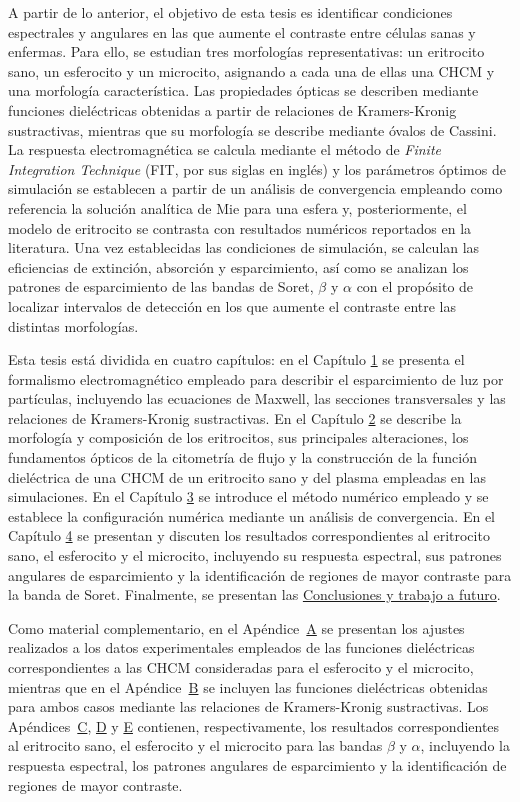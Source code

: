 A partir de lo anterior, el objetivo de esta tesis es identificar condiciones espectrales y angulares en las que aumente el contraste entre células sanas y enfermas. Para ello, se estudian tres morfologías representativas: un eritrocito sano, un esferocito y un microcito, asignando a cada una de ellas una CHCM y una morfología característica. Las propiedades ópticas se describen mediante funciones dieléctricas obtenidas a partir de relaciones de Kramers-Kronig sustractivas, mientras que su morfología se describe mediante óvalos de Cassini. La respuesta electromagnética se calcula mediante el método de \textit{Finite Integration Technique} (FIT, por sus siglas en inglés) y los parámetros óptimos de simulación se establecen a partir de un análisis de convergencia empleando como referencia la solución analítica de Mie para una esfera y, posteriormente, el modelo de eritrocito se contrasta con resultados numéricos reportados en la literatura. Una vez establecidas las condiciones de simulación, se calculan las eficiencias de extinción, absorción y esparcimiento, así como se analizan los patrones de esparcimiento de las bandas de Soret, $\beta$ y $\alpha$ con el propósito de localizar intervalos de detección en los que aumente el contraste entre las distintas morfologías.


Esta tesis está dividida en cuatro capítulos: en el Capítulo \hyperref[chapter:theory]{1} se presenta el formalismo electromagnético empleado para describir el esparcimiento de luz por partículas, incluyendo las ecuaciones de Maxwell, las secciones transversales y las relaciones de Kramers-Kronig sustractivas. En el Capítulo \hyperref[chapter:eritrocitos]{2} se describe la morfología y composición de los eritrocitos, sus principales alteraciones, los fundamentos ópticos de la citometría de flujo y la construcción de la función dieléctrica de una CHCM de un eritrocito sano y del plasma empleadas en las simulaciones. En el Capítulo \hyperref[chapter:FIT]{3} se introduce el método numérico empleado y se establece la configuración numérica mediante un análisis de convergencia. En el Capítulo \hyperref[chapter:Resultados]{4} se presentan y discuten los resultados correspondientes al eritrocito sano, el esferocito y el microcito, incluyendo su respuesta espectral, sus patrones angulares de esparcimiento y la identificación de regiones de mayor contraste para la banda de Soret.  Finalmente, se presentan las \hyperref[chapter:Resultados]{Conclusiones y trabajo a futuro}. 

Como material complementario, en el Apéndice~\hyperref[section:apendix1]{A} se presentan los ajustes realizados a los datos experimentales empleados de las funciones dieléctricas correspondientes a las CHCM consideradas para el esferocito y el microcito, mientras que en el Apéndice~\hyperref[section:apendix2]{B} se incluyen las funciones dieléctricas obtenidas para ambos casos mediante las relaciones de Kramers-Kronig sustractivas. Los Apéndices~\hyperref[section:apendix3]{C}, \hyperref[section:apendix4]{D} y \hyperref[section:apendix5]{E} contienen, respectivamente, los resultados correspondientes al eritrocito sano, el esferocito y el microcito para las bandas $\beta$ y $\alpha$, incluyendo la respuesta espectral, los patrones angulares de esparcimiento y la identificación de regiones de mayor contraste.
%
